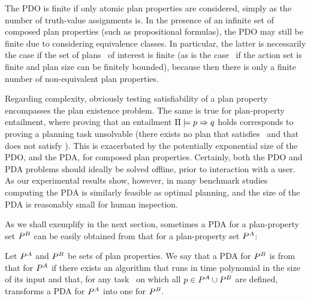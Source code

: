%
%
The PDO is finite if only atomic plan properties are considered,
simply as the number of truth-value assignments is. In the presence of
an infinite set of composed plan properties (such as propositional
formulas), the PDO may still be finite due to considering equivalence
classes. In particular, the latter is necessarily the case if the set
of plans \plans\ of interest is finite (as is the case \eg\ if the
action set is finite and plan size can be finitely bounded), because
then there is only a finite number of non-equivalent plan properties.

Regarding complexity, obviously testing satisfiability of a plan
property encompasses the plan existence problem. The same is true for
plan-property entailment, where proving that an entailment
$\Pi \models p \Rightarrow q$ holds corresponds to proving a
planning task unsolvable (there exists no plan that satisfies
\prop\ and that does not satisfy \propq). This is exacerbated by the
potentially exponential size of the PDO, and the PDA, for composed
plan properties. Certainly, both the PDO and PDA problems should
ideally be solved offline, prior to interaction with a user. As our
experimental results show, however, in many benchmark studies
computing the PDA is similarly feasible as optimal planning, and the
size of the PDA is reasonably small for human inspection.





As we shall exemplify in the next section, sometimes a PDA for a
plan-property set $P^B$ can be easily obtained from that for a
plan-property set $P^A$:

\begin{definition}
Let $P^A$ and $P^B$ be sets of plan properties. We say that
a PDA for $P^B$ is  from that for
$P^A$ if there exists an algorithm that runs in time polynomial
in the size of its input and that, for any task \task\ on which all
$p \in P^A \cup P^B$ are defined, transforms a PDA for
$P^A$ into one for $P^B$.
\end{definition}




